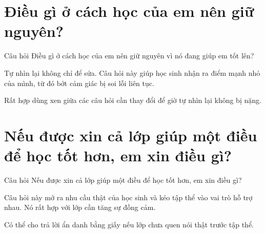 \section{Điều gì ở cách học của em nên giữ nguyên?}
\begin{cauhoibox}{Câu hỏi}
Điều gì ở cách học của em nên giữ nguyên vì nó đang giúp em tốt lên?
\end{cauhoibox}
\begin{taisaocoich}
Tự nhìn lại không chỉ để sửa. Câu hỏi này giúp học sinh nhận ra điểm mạnh nhỏ của mình, từ đó bớt cảm giác bị soi lỗi liên tục.
\end{taisaocoich}
\begin{goiybien}
Rất hợp dùng xen giữa các câu hỏi cần thay đổi để giờ tự nhìn lại không bị nặng.
\end{goiybien}
\ngancach

\section{Nếu được xin cả lớp giúp một điều để học tốt hơn, em xin điều gì?}
\begin{cauhoibox}{Câu hỏi}
Nếu được xin cả lớp giúp một điều để học tốt hơn, em xin điều gì?
\end{cauhoibox}
\begin{taisaocoich}
Câu hỏi này mở ra nhu cầu thật của học sinh và kéo tập thể vào vai trò hỗ trợ nhau. Nó rất hợp với lớp cần tăng sự đồng cảm.
\end{taisaocoich}
\begin{goiybien}
Có thể cho trả lời ẩn danh bằng giấy nếu lớp chưa quen nói thật trước tập thể.
\end{goiybien}
